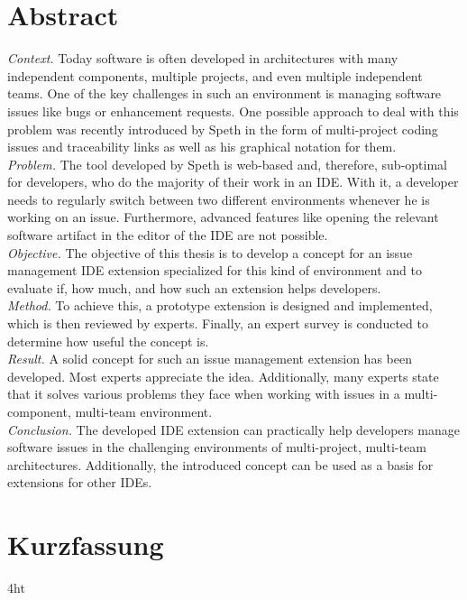 \documentclass[
  a4paper,  %
  twoside,  %
  bibliography=totoc,
  headsepline,
  cleardoublepage=empty,
  parskip=half,
  draft=false
]{scrbook}
\begin{document}
\section*{Abstract}
\textit{Context.} Today software is often developed in architectures with many independent components, multiple projects, and even multiple independent teams. 
One of the key challenges in such an environment is managing software issues like bugs or enhancement requests. 
One possible approach to deal with this problem was recently introduced by Speth in the form of multi-project coding issues and traceability links
as well as his graphical notation for them. \\
\textit{Problem.} The tool developed by Speth is web-based and, therefore, sub-optimal for developers, 
who do the majority of their work in an \gls{IDE}. 
With it, a developer needs to regularly switch between two different environments whenever he is working on an issue. 
Furthermore, advanced features like opening the relevant software artifact in the editor of the \gls{IDE} are not possible. \\
\textit{Objective.} The objective of this thesis is to develop a concept for an issue management \gls{IDE} extension specialized for this kind of environment and to evaluate if, how much, and how such an extension helps developers. \\
\textit{Method.} To achieve this, a prototype extension is designed and implemented, which is then reviewed by experts.
Finally, an expert survey is conducted to determine how useful the concept is.\\
\textit{Result.} A solid concept for such an issue management extension has been developed. 
Most experts appreciate the idea. Additionally, many experts state that it solves various problems they face when working with issues in a multi-component, multi-team environment.\\
\textit{Conclusion.} The developed \gls{IDE} extension can practically help developers manage software issues in the challenging environments of multi-project, multi-team architectures. Additionally, the introduced concept can be used as a basis for extensions for other \glspl{IDE}.
\cleardoublepage

\section*{Kurzfassung}
\lipsum[1-1]
\cleardoublepage

\iftex4ht
\else
\fi
\end{document}
